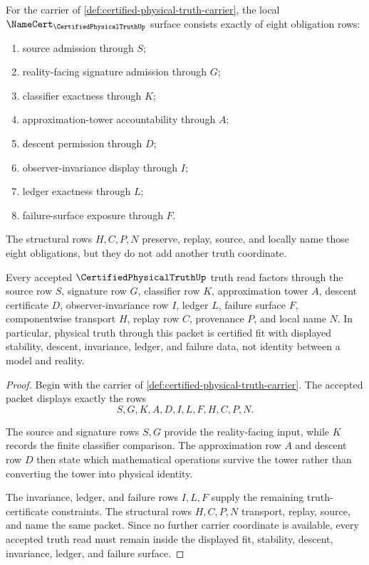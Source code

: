 \begin{definition}
\label{def:certified-physical-truth-obligation-surface}
For the carrier of \autoref{def:certified-physical-truth-carrier}, the local $\NameCert_{\CertifiedPhysicalTruthUp}$ surface consists exactly of eight obligation rows:
\begin{enumerate}
\item source admission through $S$;
\item reality-facing signature admission through $G$;
\item classifier exactness through $K$;
\item approximation-tower accountability through $A$;
\item descent permission through $D$;
\item observer-invariance display through $I$;
\item ledger exactness through $L$;
\item failure-surface exposure through $F$.
\end{enumerate}
The structural rows $H,C,P,N$ preserve, replay, source, and locally name those eight obligations, but they do not add another truth coordinate.
\end{definition}

\begin{theorem}
\label{thm:certified-physical-truth-reality-fit}
Every accepted $\CertifiedPhysicalTruthUp$ truth read factors through the source row $S$, signature row $G$, classifier row $K$, approximation tower $A$, descent certificate $D$, observer-invariance row $I$, ledger $L$, failure surface $F$, componentwise transport $H$, replay row $C$, provenance $P$, and local name $N$. In particular, physical truth through this packet is certified fit with displayed stability, descent, invariance, ledger, and failure data, not identity between a model and reality.
\end{theorem}
\begin{proof}
Begin with the carrier of \autoref{def:certified-physical-truth-carrier}. The accepted packet displays exactly the rows
$$
S,G,K,A,D,I,L,F,H,C,P,N.
$$

The source and signature rows $S,G$ provide the reality-facing input, while $K$ records the finite classifier comparison. The approximation row $A$ and descent row $D$ then state which mathematical operations survive the tower rather than converting the tower into physical identity.

The invariance, ledger, and failure rows $I,L,F$ supply the remaining truth-certificate constraints. The structural rows $H,C,P,N$ transport, replay, source, and name the same packet. Since no further carrier coordinate is available, every accepted truth read must remain inside the displayed fit, stability, descent, invariance, ledger, and failure surface.
\end{proof}


